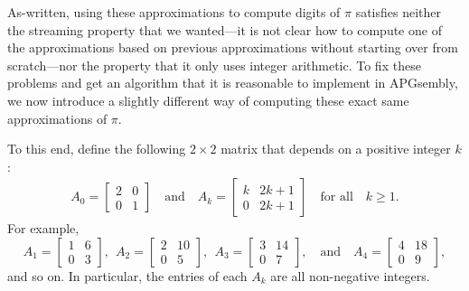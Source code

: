 As-written, using these approximations to compute digits of $\pi$ satisfies neither the streaming property that we wanted---it is not clear how to compute one of the approximations based on previous approximations without starting over from scratch---nor the property that it only uses integer arithmetic. To fix these problems and get an algorithm that it is reasonable to implement in APGsembly, we now introduce a slightly different way of computing these exact same approximations of $\pi$.

To this end, define the following $2 \times 2$ matrix that depends on a positive integer $k$:
\begin{align}\label{eq:Ak_matrices}
	A_0 = \begin{bmatrix}
		2 & 0 \\ 0 & 1
	\end{bmatrix} \quad \text{and} \quad A_k = \begin{bmatrix}
		k & 2k+1 \\ 0 & 2k+1
	\end{bmatrix} \quad \text{for all} \quad k \geq 1.
\end{align}
For example,
\[
A_1 = \begin{bmatrix}
1 & 6 \\ 0 & 3
\end{bmatrix}, \ \ A_2 = \begin{bmatrix}
2 & 10 \\ 0 & 5
\end{bmatrix}, \ \ A_3 = \begin{bmatrix}
3 & 14 \\ 0 & 7
\end{bmatrix}, \quad \text{and} \quad A_4 = \begin{bmatrix}
4 & 18 \\ 0 & 9
\end{bmatrix},
\]
and so on. In particular, the entries of each $A_k$ are all non-negative integers.

